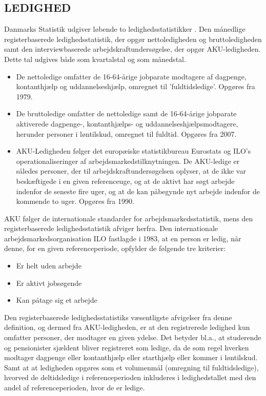 \subsection{LEDIGHED \label{}}

Danmarks Statistik udgiver løbende to ledighedsstatistikker \parencite{DST2014}. Den månedlige registerbaserede ledighedsstatistik, der opgør nettoledigheden og bruttoledigheden samt den interviewbaserede arbejdskraftundersøgelse, der opgør AKU-ledigheden. Dette tal udgives både som kvartalstal og som månedstal.
\begin{itemize}
  \item De nettoledige omfatter de 16-64-årige jobparate modtagere af dagpenge, kontanthjælp og uddannelseshjælp, omregnet til ’fuldtidsledige’. Opgøres fra 1979.
  \item De bruttoledige omfatter de nettoledige samt de 16-64-årige jobparate aktiverede dagpenge-, kontanthjælps- og uddannelseshjælpsmodtagere, herunder personer i løntilskud, omregnet til fuldtid. Opgøres fra 2007.
  \item AKU-Ledigheden følger det europæiske statistikbureau Eurostats og ILO’s operationaliseringer af arbejdsmarkedstilknytningen. De AKU-ledige er således personer, der til arbejdskraftundersøgelsen oplyser, at de ikke var beskæftigede i en given referenceuge, og at de aktivt har søgt arbejde indenfor de seneste fire uger, og at de kan påbegynde nyt arbejde indenfor de kommende to uger. Opgøres fra 1990.
\end{itemize}

AKU følger de internationale standarder for arbejdsmarkedsstatistik, mens den registerbaserede  ledighedsstatistik  afviger  herfra.  Den  internationale arbejdsmarkedsorganisation ILO fastlagde i 1983, at en person er ledig, når denne, for en given referenceperiode, opfylder de følgende tre kriterier:
\begin{itemize}
  \item Er helt uden arbejde
  \item Er aktivt jobsøgende
  \item Kan påtage sig et arbejde
\end{itemize}

Den registerbaserede ledighedsstatistiks væsentligste afvigelser fra denne definition, og dermed fra AKU-ledigheden, er at den registrerede ledighed kun omfatter personer, der modtager en given
ydelse. Det betyder bl.a., at studerende og pensionister sjældent bliver registreret som ledige, da de som regel hverken modtager dagpenge eller kontanthjælp eller starthjælp eller kommer i løntilskud. Samt at at ledigheden opgøres som et volumenmål (omregning til fuldtidsledige), hvorved de deltidsledige i referenceperioden inkluderes i ledighedstallet med den andel af referenceperioden, hvor de er ledige.

